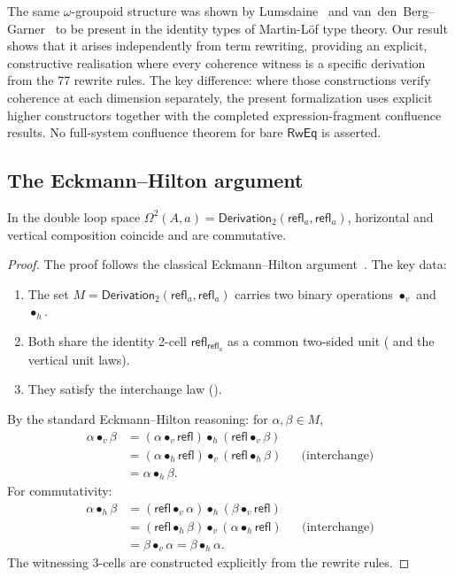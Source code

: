 \documentclass[manuscript]{BSLstyle}
\newcommand{\refl}{\mathsf{refl}}
\newcommand{\RwEq}{\mathsf{RwEq}}
\begin{document}
\begin{remark}
The same $\omega$-groupoid structure was shown by
Lumsdaine~\cite{Lumsdaine2010} and van~den~Berg--Garner~\cite{vdBergGarner2011}
to be present in the identity types of Martin-L\"of type theory.
Our result shows that it arises independently from term rewriting,
providing an explicit, constructive realisation where every coherence
witness is a specific derivation from the 77 rewrite rules.
The key difference: where those constructions verify coherence at each
dimension separately, the present formalization uses explicit higher
constructors together with the completed expression-fragment confluence
results.  No full-system confluence theorem for bare \(\RwEq\) is asserted.
\end{remark}

\subsection{The Eckmann--Hilton argument}

\begin{theorem}\label{thm:eckmann-hilton}
In the double loop space $\Omega^2(A, a) = \mathsf{Derivation}_2(\refl_a, \refl_a)$,
horizontal and vertical composition coincide and are commutative.
\end{theorem}

\begin{proof}
The proof follows the classical Eckmann--Hilton
argument~\cite{EckmannHilton62}.  The key data:
\begin{enumerate}
\item The set $M = \mathsf{Derivation}_2(\refl_a, \refl_a)$ carries two
  binary operations $\bullet_v$ and $\bullet_h$.
\item Both share the identity 2-cell $\refl_{\refl_a}$ as a common
  two-sided unit ( and the vertical unit laws).
\item They satisfy the interchange law ().
\end{enumerate}
By the standard Eckmann--Hilton reasoning: for $\alpha, \beta \in M$,
\begin{align*}
\alpha \bullet_v \beta
&= (\alpha \bullet_v \refl) \bullet_h (\refl \bullet_v \beta) \\
&= (\alpha \bullet_h \refl) \bullet_v (\refl \bullet_h \beta)
  && \text{(interchange)} \\
&= \alpha \bullet_h \beta.
\end{align*}
For commutativity:
\begin{align*}
\alpha \bullet_h \beta
&= (\refl \bullet_v \alpha) \bullet_h (\beta \bullet_v \refl) \\
&= (\refl \bullet_h \beta) \bullet_v (\alpha \bullet_h \refl)
  && \text{(interchange)} \\
&= \beta \bullet_v \alpha
= \beta \bullet_h \alpha.
\end{align*}
The witnessing 3-cells are constructed explicitly from the rewrite rules.
\end{proof}
\end{document}
